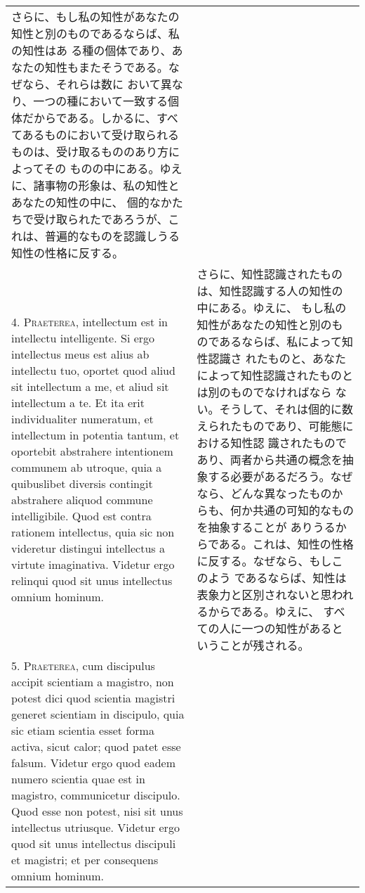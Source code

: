 \documentclass[paper=a4paper,fontsize=10pt,jafontsize=9pt,titlepage]{jlreq}
\begin{document}
\begin{longtable}{p{21em}p{21em}}
さらに、もし私の知性があなたの知性と別のものであるならば、私の知性はあ
る種の個体であり、あなたの知性もまたそうである。なぜなら、それらは数に
おいて異なり、一つの種において一致する個体だからである。しかるに、すべ
てあるものにおいて受け取られるものは、受け取るもののあり方によってその
ものの中にある。ゆえに、諸事物の形象は、私の知性とあなたの知性の中に、
個的なかたちで受け取られたであろうが、これは、普遍的なものを認識しうる
知性の性格に反する。
 
\\



4. {\scshape Praeterea}, intellectum est in intellectu
intelligente. Si ergo intellectus meus est alius ab intellectu tuo,
oportet quod aliud sit intellectum a me, et aliud sit intellectum a
te. Et ita erit individualiter numeratum, et intellectum in potentia
tantum, et oportebit abstrahere intentionem communem ab utroque, quia
a quibuslibet diversis contingit abstrahere aliquod commune
intelligibile. Quod est contra rationem intellectus, quia sic non
videretur distingui intellectus a virtute imaginativa. Videtur ergo
relinqui quod sit unus intellectus omnium hominum.

&

さらに、知性認識されたものは、知性認識する人の知性の中にある。ゆえに、
もし私の知性があなたの知性と別のものであるならば、私によって知性認識さ
れたものと、あなたによって知性認識されたものとは別のものでなければなら
ない。そうして、それは個的に数えられたものであり、可能態における知性認
識されたものであり、両者から共通の概念を抽象する必要があるだろう。なぜ
なら、どんな異なったものからも、何か共通の可知的なものを抽象することが
ありうるからである。これは、知性の性格に反する。なぜなら、もしこのよう
であるならば、知性は表象力と区別されないと思われるからである。ゆえに、
すべての人に一つの知性があるということが残される。
 
\\



5. {\scshape Praeterea}, cum discipulus accipit scientiam a magistro,
non potest dici quod scientia magistri generet scientiam in discipulo,
quia sic etiam scientia esset forma activa, sicut calor; quod patet
esse falsum. Videtur ergo quod eadem numero scientia quae est in
magistro, communicetur discipulo. Quod esse non potest, nisi sit unus
intellectus utriusque. Videtur ergo quod sit unus intellectus
discipuli et magistri; et per consequens omnium hominum.

&


\end{longtable}
\end{document}
